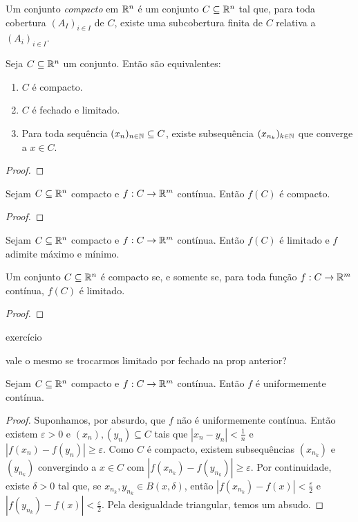 \begin{defi}
	Um conjunto \emph{compacto} em $\mathbb{R}^n$ é um conjunto $C \subseteq \mathbb{R}^n$ tal que, para toda cobertura $(A_I)_{i \in I}$ de $C$, existe uma subcobertura finita de $C$ relativa a $(A_i)_{i \in I}$.
\end{defi}

\begin{teo}
	Seja $C \subseteq \mathbb{R}^n$ um conjunto. Então são equivalentes:
	\begin{enumerate}
	\item $C$ é compacto.
	\item $C$ é fechado e limitado.
	\item Para toda sequência $(x_n)_{n \in \mathbb{N}} \subseteq C$, existe subsequência $(x_{n_k})_{k \in \mathbb{N}}$ que converge a $x \in C$.
	\end{enumerate}
\end{teo}
\begin{proof}

\end{proof}

\begin{teo}
	Sejam $C \subseteq \mathbb{R}^n$ compacto e $f: C \to \mathbb{R}^m$ contínua. Então $f(C)$ é compacto.
\end{teo}
\begin{proof}

\end{proof}

\begin{prop}
	Sejam $C \subseteq \mathbb{R}^n$ compacto e $f: C \to \mathbb{R}^m$ contínua. Então $f(C)$ é limitado e $f$ adimite máximo e mínimo.
\end{prop}

\begin{prop}
	Um conjunto $C \subseteq \mathbb{R}^n$ é compacto se, e somente se, para toda função $f: C \to \mathbb{R}^m$ contínua, $f(C)$ é limitado.
\end{prop}
\begin{proof}

\end{proof}

exercício

vale o mesmo se trocarmos limitado por fechado na prop anterior?


\begin{prop}
	Sejam $C \subseteq \mathbb{R}^n$ compacto e $f: C \to \mathbb{R}^m$ contínua. Então $f$ é uniformemente contínua.
\end{prop}
\begin{proof}
	Suponhamos, por absurdo, que $f$ não é uniformemente contínua. Então existem $\varepsilon > 0$ e $(x_n),(y_n) \subseteq C$ tais que $|x_n - y_n| < \frac{1}{n}$ e $|f(x_n)-f(y_n)| \geq \varepsilon$. Como $C$ é compacto, existem subsequências $(x_{n_k})$  e $(y_{n_k})$ convergindo a $x \in C$ com $|f(x_{n_k})-f(y_{n_k})| \geq \varepsilon$. Por continuidade, existe $\delta > 0$ tal que, se $x_{n_k},y_{n_k} \in B(x,\delta)$, então $|f(x_{n_k})-f(x)| < \frac{\varepsilon}{2}$ e $|f(y_{n_k})-f(x)| < \frac{\varepsilon}{2}$. Pela desigualdade triangular, temos um absudo.
\end{proof}

